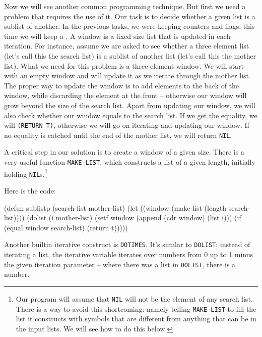 \documentclass[a4paper,11pt]{article}
\begin{document}
\begin{uenum}
\item Now we will see another
common programming technique. But first we need a problem that requires the use of it. Our task is to decide whether a given list is a sublist of another. In the previous tasks, we were keeping counters and flags; this time we will keep a . A window is a fixed size list that is updated in each iteration. For instance, assume we are asked to see whether a three element list (let's call this the search list) is a sublist of another list (let's call this the mother list). What we need for this problem is a three element window. We will start with an empty window and will update it as we iterate through the mother list. The proper way to update the window is to add elements to the back of the window, while discarding the element at the front -- otherwise our window will grow beyond the size of the search list. Apart from updating our window, we will also check whether our window equals to the search list. If we get the equality, we will \Verb+(RETURN T)+, otherwise we will go on iterating and updating our window. If no equality is catched until the end of the mother list, we will return \Verb+NIL+. 

\begin{uenumi}
\item A critical step in our solution is to create a window of a given size. There is a very useful function \Verb+MAKE-LIST+, which constructs a list of a given length, initially holding \Verb+NIL+s.\footnote{Our program will assume that \Verb+NIL+ will not be the element of any search list. There is a way to avoid this shortcoming: namely telling \Verb+MAKE-LIST+ to fill the list it constructs with symbols that are different from anything that can be in the input lists. We will see how to do this below.}

Here is the code:
\begin{lispcode}
(defun sublistp (search-list mother-list)
  (let ((window (make-list (length search-list))))
	(dolist (i mother-list)
	  (setf window (append (cdr window) (list i)))
	  (if (equal window search-list)
		(return t)))))
\end{lispcode}
\end{uenumi}

\item Another builtin iterative construct is \Verb+DOTIMES+. It's similar to \Verb+DOLIST+; instead of iterating a list, the iterative variable iterates over numbers from 0 up to 1 minus the given iteration parameter -- where there was a list in \Verb+DOLIST+, there is a number. 


\end{uenum}
\end{document}

